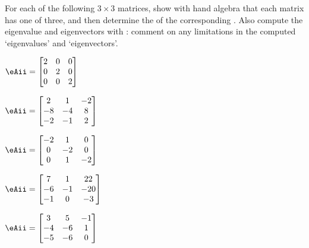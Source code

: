 \begin{exercise}  
For each of the following \(3\times3\) matrices, show with hand algebra that each matrix has one  of  three, and then determine the  of the corresponding .
Also compute the eigenvalue and eigenvectors with \script: comment on any limitations in the computed `eigenvalues' and `eigenvectors'.
\begin{Parts}
\item \(\eAii=\begin{bmatrix} 2 & 0 & 0
\\0 & 2 & 0
\\0 & 0 & 2 \end{bmatrix}\)

\item \(\eAii=\begin{bmatrix} 2 & 1 & -2
\\-8 & -4 & 8
\\-2 & -1 & 2 \end{bmatrix}\)

\item \(\eAii=\begin{bmatrix} -2 & 1 & 0
\\0 & -2 & 0
\\0 & 1 & -2 \end{bmatrix}\)

\item \(\eAii=\begin{bmatrix} 7 & 1 & 22
\\-6 & -1 & -20
\\-1 & 0 & -3 \end{bmatrix}\)

\begin{OmitV1}
\item \(\eAii=\begin{bmatrix} 3 & 5 & -1
\\-4 & -6 & 1
\\-5 & -6 & 0 \end{bmatrix}\)


\end{OmitV1}
\end{Parts}
\end{exercise}
